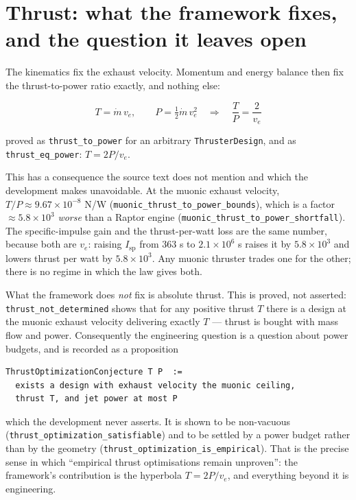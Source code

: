 \documentclass[11pt,a4paper]{article}
\begin{document}
\section{Thrust: what the framework fixes, and the question it leaves open}
\label{sec:thrust}

The kinematics fix the exhaust velocity.  Momentum and energy balance then fix
the thrust-to-power ratio exactly, and nothing else:

\[
  T = \dot m\, v_e, \qquad P = \tfrac12 \dot m\, v_e^2
  \quad\Longrightarrow\quad
  \frac{T}{P} = \frac{2}{v_e}
\]

\noindent proved as \texttt{thrust\_to\_power} for an arbitrary
\texttt{ThrusterDesign}, and as \texttt{thrust\_eq\_power}: $T = 2P/v_e$.

This has a consequence the source text does not mention and which the
development makes unavoidable.  At the muonic exhaust velocity,
$T/P \approx 9.67\times10^{-8}$ N/W
(\texttt{muonic\_thrust\_to\_power\_bounds}), which is a factor
$\approx 5.8\times10^{3}$ \emph{worse} than a Raptor engine
(\texttt{muonic\_thrust\_to\_power\_shortfall}).  The specific-impulse gain and
the thrust-per-watt loss are the same number, because both are $v_e$: raising
$I_\mathrm{sp}$ from $363$ s to $2.1\times10^{6}$ s raises it by $5.8\times10^{3}$
and lowers thrust per watt by $5.8\times10^{3}$.  Any muonic thruster trades one
for the other; there is no regime in which the law gives both.

What the framework does \emph{not} fix is absolute thrust.  This is proved, not
asserted: \texttt{thrust\_not\_determined} shows that for any positive thrust
$T$ there is a design at the muonic exhaust velocity delivering exactly $T$ ---
thrust is bought with mass flow and power.  Consequently the engineering
question is a question about power budgets, and is recorded as a proposition

\begin{verbatim}
ThrustOptimizationConjecture T P  :=
  exists a design with exhaust velocity the muonic ceiling,
  thrust T, and jet power at most P
\end{verbatim}

\noindent which the development never asserts.  It is shown to be non-vacuous
(\texttt{thrust\_optimization\_satisfiable}) and to be settled by a power budget
rather than by the geometry (\texttt{thrust\_optimization\_is\_empirical}).  That
is the precise sense in which ``empirical thrust optimisations remain
unproven'': the framework's contribution is the hyperbola $T = 2P/v_e$, and
everything beyond it is engineering.
\end{document}
